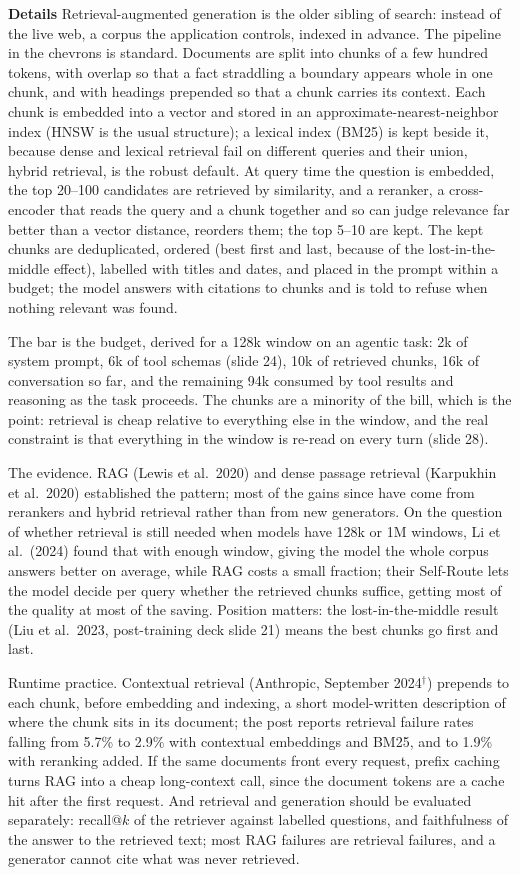 \documentclass[11pt,letterpaper]{article}
\newcommand{\para}[1]{\medskip\noindent\textbf{#1}\quad}
\begin{document}
\para{Details} Retrieval-augmented generation is the older sibling of search: instead of the live web, a corpus the application controls, indexed in advance. The pipeline in the chevrons is standard. Documents are split into chunks of a few hundred tokens, with overlap so that a fact straddling a boundary appears whole in one chunk, and with headings prepended so that a chunk carries its context. Each chunk is embedded into a vector and stored in an approximate-nearest-neighbor index (HNSW is the usual structure); a lexical index (BM25) is kept beside it, because dense and lexical retrieval fail on different queries and their union, hybrid retrieval, is the robust default. At query time the question is embedded, the top 20--100 candidates are retrieved by similarity, and a reranker, a cross-encoder that reads the query and a chunk together and so can judge relevance far better than a vector distance, reorders them; the top 5--10 are kept. The kept chunks are deduplicated, ordered (best first and last, because of the lost-in-the-middle effect), labelled with titles and dates, and placed in the prompt within a budget; the model answers with citations to chunks and is told to refuse when nothing relevant was found.

The bar is the budget, derived for a 128k window on an agentic task: 2k of system prompt, 6k of tool schemas (slide 24), 10k of retrieved chunks, 16k of conversation so far, and the remaining 94k consumed by tool results and reasoning as the task proceeds. The chunks are a minority of the bill, which is the point: retrieval is cheap relative to everything else in the window, and the real constraint is that everything in the window is re-read on every turn (slide 28).

The evidence. RAG (Lewis et al.\ 2020) and dense passage retrieval (Karpukhin et al.\ 2020) established the pattern; most of the gains since have come from rerankers and hybrid retrieval rather than from new generators. On the question of whether retrieval is still needed when models have 128k or 1M windows, Li et al.\ (2024) found that with enough window, giving the model the whole corpus answers better on average, while RAG costs a small fraction; their Self-Route lets the model decide per query whether the retrieved chunks suffice, getting most of the quality at most of the saving. Position matters: the lost-in-the-middle result (Liu et al.\ 2023, post-training deck slide 21) means the best chunks go first and last.

Runtime practice. Contextual retrieval (Anthropic, September 2024$^\dagger$) prepends to each chunk, before embedding and indexing, a short model-written description of where the chunk sits in its document; the post reports retrieval failure rates falling from 5.7\% to 2.9\% with contextual embeddings and BM25, and to 1.9\% with reranking added. If the same documents front every request, prefix caching turns RAG into a cheap long-context call, since the document tokens are a cache hit after the first request. And retrieval and generation should be evaluated separately: recall@$k$ of the retriever against labelled questions, and faithfulness of the answer to the retrieved text; most RAG failures are retrieval failures, and a generator cannot cite what was never retrieved.
\end{document}
